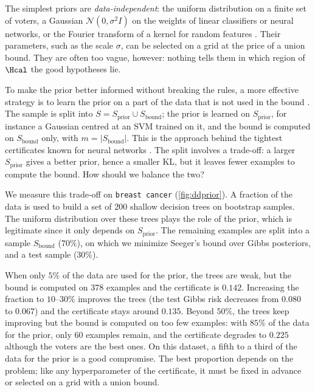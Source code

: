 The simplest priors are \emph{data-independent}: the uniform distribution on a
finite set of voters, a Gaussian $\mathcal N(0,\sigma^2 I)$ on the weights of
linear classifiers or neural networks, or the Fourier transform of a kernel for
random features \citep{letarte2019pseudo}. Their parameters, such as the scale
$\sigma$, can be selected on a grid at the price of a union bound. They are
often too vague, however: nothing tells them in which region of $\Hcal$ the
good hypotheses lie.

To make the prior better informed without breaking the rules, a more effective strategy is to learn the prior on a part of the data that is
not used in the bound \citep{ambroladze2006tighter,parrado2012pac}. The sample is
split into $S=S_{\text{prior}}\cup S_{\text{bound}}$; the prior is learned on
$S_{\text{prior}}$, for instance a Gaussian centred at an SVM trained on it,
and the bound is computed on $S_{\text{bound}}$ only, with $m=|S_{\text{bound}}|$.
This is the approach behind the tightest certificates known for neural networks
\citep{dziugaite2017computing,perez2021tighter}. The split involves a trade-off:
a larger $S_{\text{prior}}$ gives a better prior, hence a smaller KL, but it
leaves fewer examples to compute the bound. How should we balance the two?

\begin{example}
We measure this trade-off on \texttt{breast cancer} (\cref{fig:ddprior}). A
fraction of the data is used to build a set of $200$ shallow decision trees on
bootstrap samples. The uniform distribution over these trees plays the role of
the prior, which is legitimate since it only depends on $S_{\text{prior}}$. The
remaining examples are split into a sample $S_{\text{bound}}$ ($70\%$), on which
we minimize Seeger's bound over Gibbs posteriors, and a test sample ($30\%$).

When only $5\%$ of the data are used for the prior, the trees are weak, but the
bound is computed on $378$ examples and the certificate is $0.142$. Increasing
the fraction to $10$--$30\%$ improves the trees (the test Gibbs risk decreases
from $0.080$ to $0.067$) and the certificate stays around $0.135$. Beyond $50\%$,
the trees keep improving but the bound is computed on too few examples: with
$85\%$ of the data for the prior, only $60$ examples remain, and the certificate
degrades to $0.225$ although the voters are the best ones. On this dataset, a
fifth to a third of the data for the prior is a good compromise. The best
proportion depends on the problem; like any hyperparameter of the certificate,
it must be fixed in advance or selected on a grid with a union bound.
\end{example}


